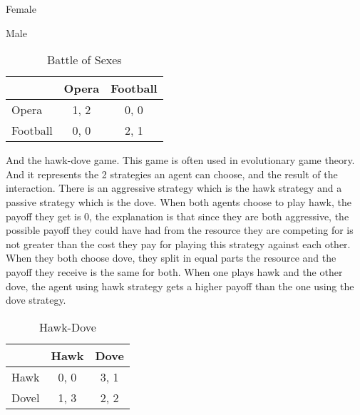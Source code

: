 \begin{table}[h]
\begin{center}
Female


Male
\begin{tabular}{|l|c|c|}
\hline
 & Opera & Football \\ 
\hline
Opera & 1, 2 & 0, 0\\
\hline
 Football & 0, 0 & 2, 1\\
\hline
\end{tabular}
\end{center}
\caption{Battle of Sexes}
\label{tab:bostag}
\end{table}

And the hawk-dove game. This game is often used in  evolutionary game theory. And it represents the 2 strategies an agent can choose,  and the result of the interaction. There is an aggressive strategy which is the hawk strategy and a passive strategy which is the dove. When both agents choose to play hawk, the payoff they get is 0, the explanation is that since they are both aggressive, the possible payoff they could have had from the resource they are competing for is not greater than the cost they pay for playing this strategy against each other. When they both choose dove, they split in equal parts the resource and the payoff they receive is the same for both. When one plays hawk and the other dove, the agent using hawk strategy gets a higher payoff than the one using the dove strategy.    

\begin{table}[h]
\begin{center}
\begin{tabular}{|l|c|c|}
\hline
 & Hawk & Dove \\ 
\hline
Hawk & 0, 0 & 3, 1\\
\hline
 Dovel & 1, 3 & 2, 2\\
\hline
\end{tabular}
\end{center}
\caption{Hawk-Dove}
\label{tab:hdtag}
\end{table}
